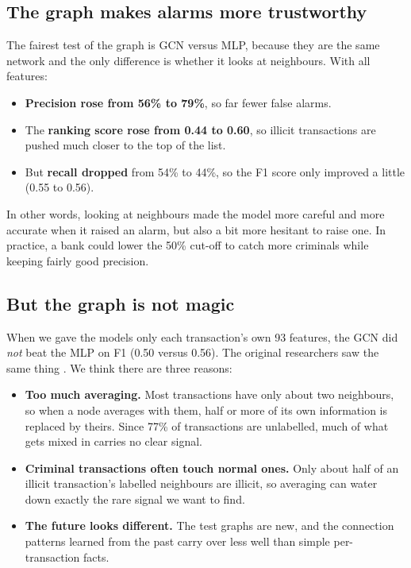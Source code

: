 \documentclass[11pt,a4paper]{article}
\begin{document}
\subsection{The graph makes alarms more trustworthy}
The fairest test of the graph is GCN versus MLP, because they are the same network and the only difference is whether it
looks at neighbours. With all features:
\begin{itemize}
  \item \textbf{Precision rose from 56\% to 79\%}, so far fewer false alarms.
  \item The \textbf{ranking score rose from 0.44 to 0.60}, so illicit transactions are pushed much closer to the top of the list.
  \item But \textbf{recall dropped} from 54\% to 44\%, so the F1 score only improved a little (0.55 to 0.56).
\end{itemize}
In other words, looking at neighbours made the model more careful and more accurate when it raised an alarm, but also a bit more
hesitant to raise one. In practice, a bank could lower the 50\% cut-off to catch more criminals while keeping fairly good precision.

\subsection{But the graph is not magic}
When we gave the models only each transaction's own 93 features, the GCN did \emph{not} beat the MLP on F1 (0.50 versus 0.56).
The original researchers saw the same thing \cite{weber}. We think there are three reasons:
\begin{itemize}
  \item \textbf{Too much averaging.} Most transactions have only about two neighbours, so when a node averages with them,
        half or more of its own information is replaced by theirs. Since 77\% of transactions are unlabelled, much of what gets
        mixed in carries no clear signal.
  \item \textbf{Criminal transactions often touch normal ones.} Only about half of an illicit transaction's labelled neighbours
        are illicit, so averaging can water down exactly the rare signal we want to find.
  \item \textbf{The future looks different.} The test graphs are new, and the connection patterns learned from the past
        carry over less well than simple per-transaction facts.
\end{itemize}
\end{document}
